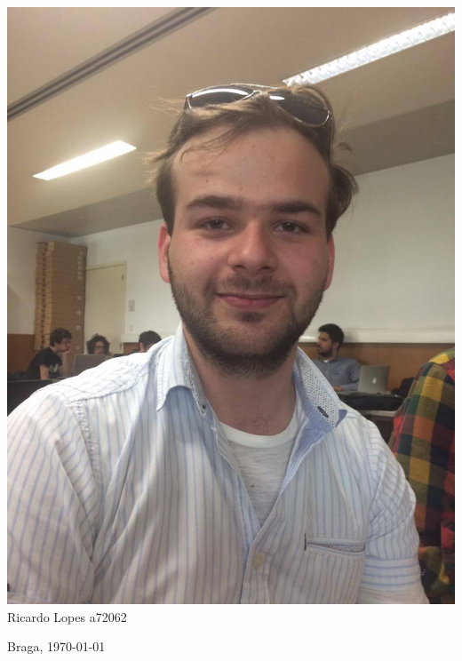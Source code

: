\begin{titlepage}
\begin{center}
\begin{minipage}[b]{.1\textwidth}	\includegraphics[scale=0.1]{ricardo}
		\tiny{Ricardo Lopes a72062}
\end{minipage}



\vspace{3ex}


\vfill

\large Braga, {\large \today}

\end{center}
\end{titlepage}
